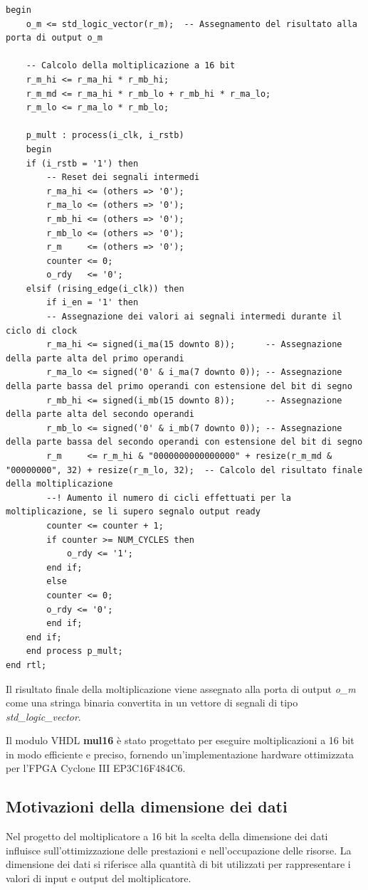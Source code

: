 \documentclass[titlepage]{report}
\begin{document}
\begin{lstlisting}[caption={\textbf{mul16.vhd} - architettura del motiplicatore a 16 bit}, label={lst:mul16_process}]
begin
	o_m <= std_logic_vector(r_m);  -- Assegnamento del risultato alla porta di output o_m

	-- Calcolo della moltiplicazione a 16 bit
	r_m_hi <= r_ma_hi * r_mb_hi;
	r_m_md <= r_ma_hi * r_mb_lo + r_mb_hi * r_ma_lo;
	r_m_lo <= r_ma_lo * r_mb_lo;

	p_mult : process(i_clk, i_rstb)
	begin
	if (i_rstb = '1') then
		-- Reset dei segnali intermedi
		r_ma_hi <= (others => '0');
		r_ma_lo <= (others => '0');
		r_mb_hi <= (others => '0');
		r_mb_lo <= (others => '0');
		r_m     <= (others => '0');
		counter <= 0;
		o_rdy   <= '0';
	elsif (rising_edge(i_clk)) then
		if i_en = '1' then
		-- Assegnazione dei valori ai segnali intermedi durante il ciclo di clock
		r_ma_hi <= signed(i_ma(15 downto 8));      -- Assegnazione della parte alta del primo operandi
		r_ma_lo <= signed('0' & i_ma(7 downto 0)); -- Assegnazione della parte bassa del primo operandi con estensione del bit di segno
		r_mb_hi <= signed(i_mb(15 downto 8));      -- Assegnazione della parte alta del secondo operandi
		r_mb_lo <= signed('0' & i_mb(7 downto 0)); -- Assegnazione della parte bassa del secondo operandi con estensione del bit di segno
		r_m     <= r_m_hi & "0000000000000000" + resize(r_m_md & "00000000", 32) + resize(r_m_lo, 32);  -- Calcolo del risultato finale della moltiplicazione
		--! Aumento il numero di cicli effettuati per la moltiplicazione, se li supero segnalo output ready
		counter <= counter + 1;
		if counter >= NUM_CYCLES then
			o_rdy <= '1';
		end if;
		else
		counter <= 0;
		o_rdy <= '0';
		end if;
	end if;
	end process p_mult;
end rtl;
		\end{lstlisting}
		
		Il risultato finale della moltiplicazione viene assegnato alla porta di output \textit{o\_m} come una stringa binaria convertita in un vettore di segnali di tipo \textit{std\_logic\_vector}.
		
		Il modulo VHDL \textbf{mul16} è stato progettato per eseguire moltiplicazioni a 16 bit in modo efficiente e preciso, fornendo un'implementazione hardware ottimizzata per l'FPGA Cyclone III EP3C16F484C6.
		
		\subsection*{Motivazioni della dimensione dei dati}
		\label{subsec:scelta_dimensione_dati}
			Nel progetto del moltiplicatore a 16 bit la scelta della dimensione dei dati influisce sull'ottimizzazione delle prestazioni e nell'occupazione delle risorse. La dimensione dei dati si riferisce alla quantità di bit utilizzati per rappresentare i valori di input e output del moltiplicatore.
\end{document}
